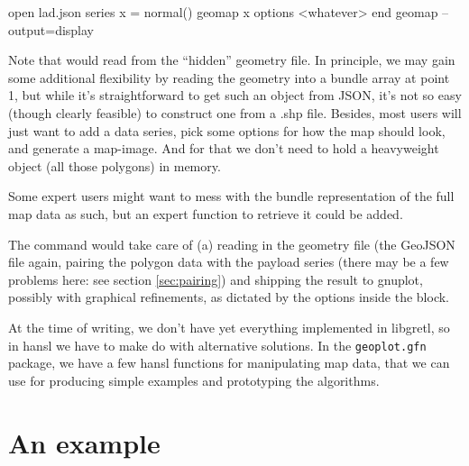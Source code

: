 \documentclass{article}
\begin{document}
\begin{scode}
  open lad.json 
  series x = normal() 
  geomap x 
     options <whatever> 
  end geomap --output=display
\end{scode}

Note that  would read from the ``hidden'' geometry
file. In principle, we may gain some additional flexibility by reading
the geometry into a bundle array at point 1, but while it's
straightforward to get such an object from JSON, it's not so easy
(though clearly feasible) to construct one from a .shp file. Besides,
most users will just want to add a data series, pick some options for
how the map should look, and generate a map-image.  And for that we
don't need to hold a heavyweight object (all those polygons) in
memory.

Some expert users might want to mess with the bundle
representation of the full map data as such, but an expert function to
retrieve it could be added.

The  command would take care of (a) reading in the
geometry file (the GeoJSON file again, pairing the polygon data with
the payload series (there may be a few problems here: see section
\ref{sec:pairing}) and shipping the result to gnuplot, possibly with
graphical refinements, as dictated by the options inside the block.

At the time of writing, we don't have yet everything implemented in
libgretl, so in hansl we have to make do with alternative
solutions. In the \texttt{geoplot.gfn} package, we have a few hansl
functions for manipulating map data, that we can use for producing
simple examples and prototyping the algorithms.

\section{An example}
\label{sec:example}
\end{document}
